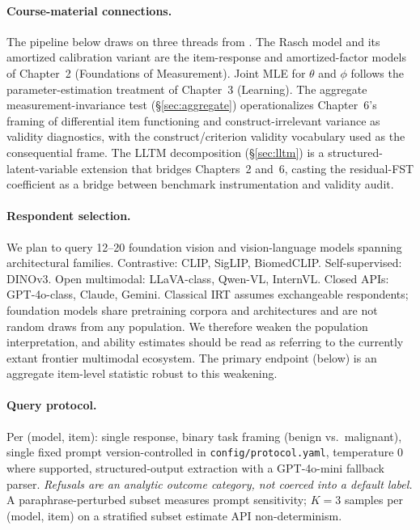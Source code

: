 \documentclass{article}
\begin{document}
\paragraph{Course-material connections.}
The pipeline below draws on three threads from \citet{truong2026aims}. The Rasch model and its amortized calibration variant are the item-response and amortized-factor models of Chapter~2 (Foundations of Measurement). Joint MLE for $\theta$ and $\phi$ follows the parameter-estimation treatment of Chapter~3 (Learning). The aggregate measurement-invariance test (\S\ref{sec:aggregate}) operationalizes Chapter~6's framing of differential item functioning and construct-irrelevant variance as validity diagnostics, with the construct/criterion validity vocabulary used as the consequential frame. The LLTM decomposition (\S\ref{sec:lltm}) is a structured-latent-variable extension that bridges Chapters~2 and~6, casting the residual-FST coefficient as a bridge between benchmark instrumentation and validity audit.

\paragraph{Respondent selection.}
\label{sec:respondents}
We plan to query 12--20 foundation vision and vision-language models spanning architectural families. Contrastive: CLIP, SigLIP, BiomedCLIP. Self-supervised: DINOv3. Open multimodal: LLaVA-class, Qwen-VL, InternVL. Closed APIs: GPT-4o-class, Claude, Gemini. Classical IRT assumes exchangeable respondents; foundation models share pretraining corpora and architectures and are not random draws from any population. We therefore weaken the population interpretation, and ability estimates should be read as referring to the currently extant frontier multimodal ecosystem. The primary endpoint (below) is an aggregate item-level statistic robust to this weakening.

\paragraph{Query protocol.}
\label{sec:query}
Per (model, item): single response, binary task framing (benign vs.\ malignant), single fixed prompt version-controlled in \texttt{config/protocol.yaml}, temperature 0 where supported, structured-output extraction with a GPT-4o-mini fallback parser. \emph{Refusals are an analytic outcome category, not coerced into a default label.} A paraphrase-perturbed subset measures prompt sensitivity; $K = 3$ samples per (model, item) on a stratified subset estimate API non-determinism.
\end{document}
